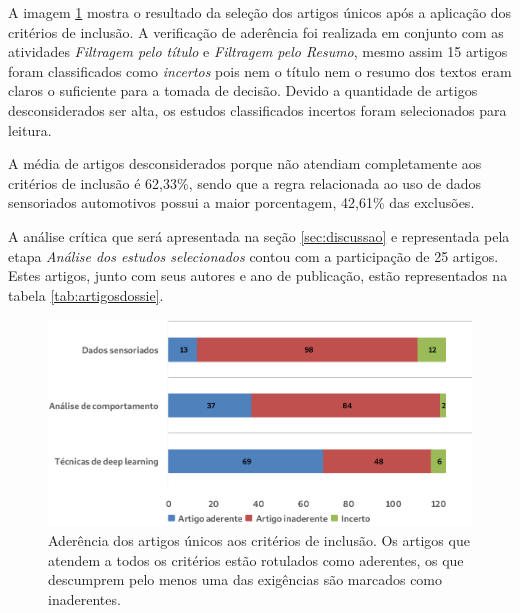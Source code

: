 \documentclass[10pt,journal,compsoc]{IEEEtran}
\begin{document}
A imagem \ref{fig:distselecao} mostra o resultado da seleção dos
artigos únicos após a aplicação dos critérios de inclusão. A
verificação de aderência foi realizada em
conjunto com as atividades \emph{Filtragem pelo título} e
\emph{Filtragem pelo Resumo}, mesmo assim 15 artigos foram
classificados como \emph{incertos} pois nem o título nem o resumo dos textos eram
claros o suficiente para a tomada de decisão. Devido a quantidade de
artigos desconsiderados ser alta, os estudos classificados incertos foram selecionados para
leitura.

A média de artigos desconsiderados porque não atendiam completamente aos critérios de
inclusão é 62,33\%, sendo que a regra relacionada ao uso de dados
sensoriados automotivos possui a maior porcentagem, 42,61\% das
exclusões.

A análise crítica que será apresentada na seção \ref{sec:discussao} e
representada pela etapa \emph{Análise dos estudos selecionados} contou
com a participação de 25 artigos. Estes artigos, junto com seus
autores e ano de publicação, estão representados na tabela \ref{tab:artigosdossie}.

\begin{figure}[!t]
\centering
\includegraphics[scale=0.25]{distribuicao_selecao}
\caption{Aderência dos artigos únicos aos critérios de inclusão. Os
  artigos que atendem a todos os critérios estão
  rotulados como aderentes, os que descumprem pelo menos
  uma das exigências são marcados como inaderentes.}
\label{fig:distselecao}
\end{figure}
\end{document}
